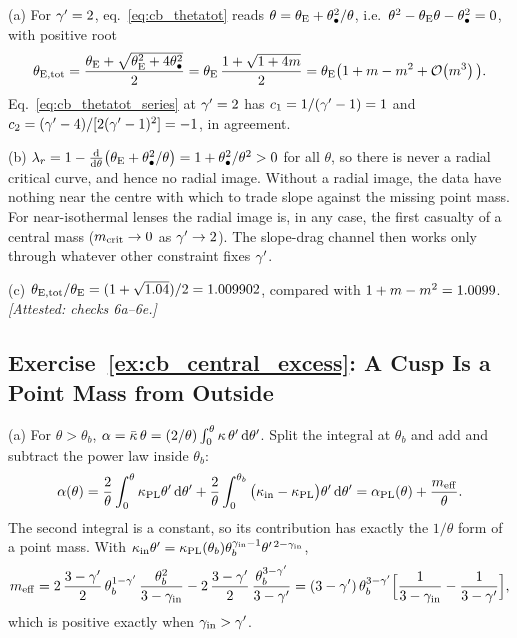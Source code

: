 (a) For $\gamma'=2$, eq.~\eqref{eq:cb_thetatot} reads
$\theta=\theta_{\mathrm{E}}+\theta_{\bullet}^2/\theta$, i.e.\
$\theta^2-\theta_{\mathrm{E}}\theta-\theta_{\bullet}^2=0$, with positive root
\begin{equation*}
  \theta_{\mathrm{E,tot}}=\frac{\theta_{\mathrm{E}}+\sqrt{\theta_{\mathrm{E}}^2+4\theta_{\bullet}^2}}{2}
  =\theta_{\mathrm{E}}\,\frac{1+\sqrt{1+4m}}{2}
  =\theta_{\mathrm{E}}\big(1+m-m^2+\mathcal{O}\!\left(m^3\right)\big).
\end{equation*}
Eq.~\eqref{eq:cb_thetatot_series} at $\gamma'=2$ has $c_1=1/(\gamma'-1)=1$ and
$c_2=(\gamma'-4)/[2(\gamma'-1)^2]=-1$, in agreement.

(b) $\lambda_r=1-\frac{\mathrm{d} }{\mathrm{d} \theta}\big(\theta_{\mathrm{E}}+\theta_{\bullet}^2/\theta\big)
=1+\theta_{\bullet}^2/\theta^2>0$ for all $\theta$, so there is never a radial
critical curve, and hence no radial image. Without a radial image, the
data have nothing near the centre with which to trade slope against the
missing point mass. For near-isothermal lenses the radial image is, in
any case, the first casualty of a central mass
($m_{\rm crit}\to0$ as $\gamma'\to2$). The slope-drag channel then works
only through whatever other constraint fixes $\gamma'$.

(c) $\theta_{\mathrm{E,tot}}/\theta_{\mathrm{E}}=(1+\sqrt{1.04})/2=1.009902$,
compared with $1+m-m^2=1.0099$.
\emph{[Attested: checks 6a--6e.]}

\subsection*{Exercise~\ref{ex:cb_central_excess}: A Cusp Is a Point Mass from Outside}

(a) For $\theta>\theta_b$, $\alpha=\bar\kappa\,\theta=(2/\theta)\int_0^\theta\kappa\,\theta'\,\dd\theta'$.
Split the integral at $\theta_b$ and add and subtract the power law
inside $\theta_b$:
\begin{equation*}
  \alpha(\theta)=\frac{2}{\theta}\int_0^{\theta}\kappa_{\rm PL}\theta'\,\dd\theta'
  +\frac{2}{\theta}\int_0^{\theta_b}\big(\kappa_{\rm in}-\kappa_{\rm PL}\big)\theta'\,\dd\theta'
  =\alpha_{\rm PL}(\theta)+\frac{m_{\rm eff}}{\theta}.
\end{equation*}
The second integral is a constant, so its contribution has exactly the
$1/\theta$ form of a point mass. With
$\kappa_{\rm in}\theta'=\kappa_{\rm PL}(\theta_b)\theta_b^{\gamma_{\rm in}-1}\theta'^{\,2-\gamma_{\rm in}}$,
\begin{equation*}
  m_{\rm eff}=2\,\frac{3-\gamma'}{2}\,\theta_b^{1-\gamma'}\,\frac{\theta_b^{2}}{3-\gamma_{\rm in}}
  -2\,\frac{3-\gamma'}{2}\,\frac{\theta_b^{3-\gamma'}}{3-\gamma'}
  =(3-\gamma')\,\theta_b^{3-\gamma'}\Big[\frac{1}{3-\gamma_{\rm in}}-\frac{1}{3-\gamma'}\Big],
\end{equation*}
which is positive exactly when $\gamma_{\rm in}>\gamma'$.

